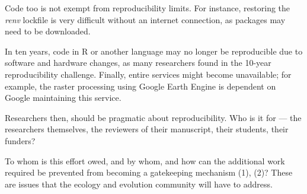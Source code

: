 	Code too is not exempt from reproducibility limits. For instance, restoring the \textit{renv} lockfile is very difficult without an internet connection, as packages may need to be downloaded.

	In ten years, code in R or another language may no longer be reproducible due to software and hardware changes, as many researchers found in the 10-year reproducibility challenge. Finally, entire services might become unavailable; for example, the raster processing using Google Earth Engine is dependent on Google maintaining this service.

	Researchers then, should be pragmatic about reproducibility. Who is it for — the researchers themselves, the reviewers of their manuscript, their students, their funders?

	To whom is this effort owed, and by whom, and how can the additional work required be prevented from becoming a gatekeeping mechanism (1), (2)? These are issues that the ecology and evolution community will have to address.
	
\pagestyle{scrheadings}







